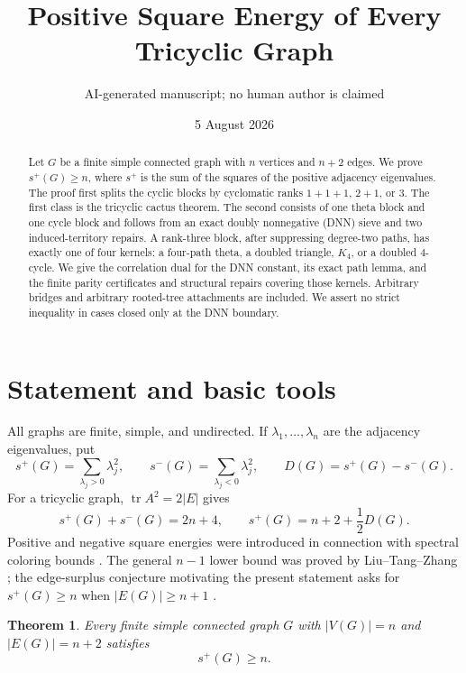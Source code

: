 \documentclass[11pt]{article}
\title{Positive Square Energy of Every Tricyclic Graph}
\author{AI-generated manuscript; no human author is claimed}
\date{5 August 2026}
\newtheorem{theorem}{Theorem}[section]
\theoremstyle{remark}
\newcommand{\splus}{s^+}
\newcommand{\sminus}{s^-}
\begin{document}
\maketitle

\begin{abstract}
Let $G$ be a finite simple connected graph with $n$ vertices and $n+2$
edges.  We prove $\splus(G)\geq n$, where $\splus$ is the sum of the squares
of the positive adjacency eigenvalues.  The proof first splits the cyclic
blocks by cyclomatic ranks $1+1+1$, $2+1$, or $3$.  The first class is the
tricyclic cactus theorem.  The second consists of one theta block and one
cycle block and follows from an exact doubly nonnegative (DNN) sieve and two
induced-territory repairs.  A rank-three block, after suppressing degree-two
paths, has exactly one of four kernels: a four-path theta, a doubled triangle,
$K_4$, or a doubled $4$-cycle.  We give the correlation dual for the DNN
constant, its exact path lemma, and the finite parity certificates and
structural repairs covering those kernels.  Arbitrary bridges and arbitrary
rooted-tree attachments are included.  We assert no strict inequality in
cases closed only at the DNN boundary.
\end{abstract}

\section{Statement and basic tools}

All graphs are finite, simple, and undirected.  If
$\lambda_1,\ldots,\lambda_n$ are the adjacency eigenvalues, put
\[
 \splus(G)=\sum_{\lambda_j>0}\lambda_j^2,
 \qquad \sminus(G)=\sum_{\lambda_j<0}\lambda_j^2,
 \qquad D(G)=\splus(G)-\sminus(G).
\]
For a tricyclic graph, $\operatorname{tr}A^2=2|E|$ gives
\begin{equation}\label{eq:energy}
 \splus(G)+\sminus(G)=2n+4,
 \qquad \splus(G)=n+2+\frac12D(G).
\end{equation}
Positive and negative square energies were introduced in connection with
spectral coloring bounds \cite{AbiadEtAl}.  The general $n-1$ lower bound was
proved by Liu--Tang--Zhang \cite{LTZ}; the edge-surplus conjecture motivating
the present statement asks for $\splus(G)\geq n$ when $|E(G)|\geq n+1$
\cite{AKMPZ}.

\begin{theorem}\label{thm:main}
Every finite simple connected graph $G$ with $|V(G)|=n$ and
$|E(G)|=n+2$ satisfies
\[
 \boxed{\splus(G)\geq n}.
\]
\end{theorem}
\end{document}
